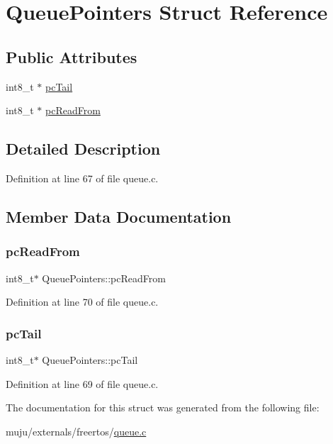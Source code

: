 \hypertarget{struct_queue_pointers}{}\section{Queue\+Pointers Struct Reference}
\label{struct_queue_pointers}
\subsection*{Public Attributes}
\begin{DoxyCompactItemize}
\item 
int8\+\_\+t $\ast$ \hyperlink{struct_queue_pointers_acbbdc8eb47b348a824c7bced41512a38}{pc\+Tail}
\item 
int8\+\_\+t $\ast$ \hyperlink{struct_queue_pointers_af381d02bbe6bc4a77934c6fd97598913}{pc\+Read\+From}
\end{DoxyCompactItemize}


\subsection{Detailed Description}


Definition at line 67 of file queue.\+c.



\subsection{Member Data Documentation}
\mbox{\label{struct_queue_pointers_af381d02bbe6bc4a77934c6fd97598913}} 
\subsubsection{\texorpdfstring{pc\+Read\+From}{pcReadFrom}}
{\footnotesize\ttfamily int8\+\_\+t$\ast$ Queue\+Pointers\+::pc\+Read\+From}



Definition at line 70 of file queue.\+c.

\mbox{\label{struct_queue_pointers_acbbdc8eb47b348a824c7bced41512a38}} 
\subsubsection{\texorpdfstring{pc\+Tail}{pcTail}}
{\footnotesize\ttfamily int8\+\_\+t$\ast$ Queue\+Pointers\+::pc\+Tail}



Definition at line 69 of file queue.\+c.



The documentation for this struct was generated from the following file\+:\begin{DoxyCompactItemize}
\item 
muju/externals/freertos/\hyperlink{externals_2freertos_2queue_8c}{queue.\+c}\end{DoxyCompactItemize}
